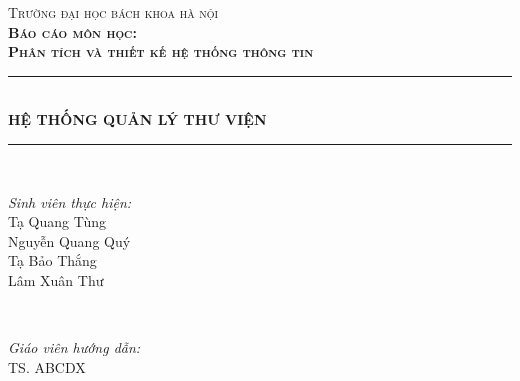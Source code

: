 \documentclass[12pt]{report}
\begin{document}
\begin{titlepage}

\newcommand{\HRule}{\rule{\linewidth}{0.5mm}} %

\center %
 
\textsc{\LARGE Trường đại học bách khoa hà nội}\\[1cm] %
\textsc{\large\bfseries Báo cáo môn học:} \\[0.2cm]
\textsc{\LARGE\bfseries Phân tích và thiết kế hệ thống thông tin}\\[1cm] %

\HRule \\[0.4cm]
{\Huge \bfseries HỆ THỐNG QUẢN LÝ THƯ VIỆN}\\[0.3cm] %
\HRule \\[1.5cm]

 
\begin{minipage}{0.4\textwidth}
\begin{flushleft} \large
\emph{Sinh viên thực hiện:}\\
Tạ Quang Tùng \\
Nguyễn Quang Quý \\
Tạ Bảo Thắng \\
Lâm Xuân Thư 
\end{flushleft}
\end{minipage}
~
\begin{minipage}{0.4\textwidth}
\begin{flushright} \large
\emph{Giáo viên hướng dẫn:} \\
TS. ABCDX
\end{flushright}
\end{minipage}\\[2cm]


\end{titlepage}
\end{document}
